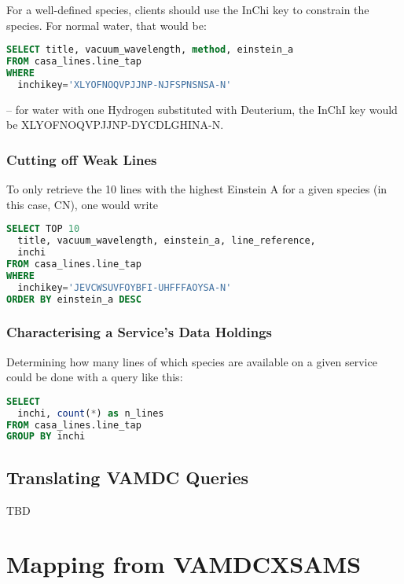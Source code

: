\documentclass[11pt,a4paper]{ivoa}
\begin{document}
For a well-defined species, clients should use the InChi key to
constrain the species.  For
normal water, that would be:

\begin{lstlisting}[language=SQL]
SELECT title, vacuum_wavelength, method, einstein_a
FROM casa_lines.line_tap
WHERE
  inchikey='XLYOFNOQVPJJNP-NJFSPNSNSA-N'
\end{lstlisting}

-- for water with one Hydrogen substituted with Deuterium, the InChI key
would be XLYOFNOQVPJJNP-DYCDLGHINA-N.

\subsubsection{Cutting off Weak Lines}

To only retrieve the 10 lines with the highest Einstein A for a given
species (in this case, CN), one would write

\begin{lstlisting}[language=SQL]
SELECT TOP 10
  title, vacuum_wavelength, einstein_a, line_reference,
  inchi
FROM casa_lines.line_tap
WHERE
  inchikey='JEVCWSUVFOYBFI-UHFFFAOYSA-N'
ORDER BY einstein_a DESC
\end{lstlisting}


\subsubsection{Characterising a Service's Data Holdings}

Determining how many lines of which species are available on a given
service could be done with a query like this:

\begin{lstlisting}[language=SQL]
SELECT 
  inchi, count(*) as n_lines
FROM casa_lines.line_tap
GROUP BY inchi
\end{lstlisting}


\subsection{Translating VAMDC Queries}
TBD


\section{Mapping from VAMDCXSAMS}
\label{sect:mapping}
\end{document}
